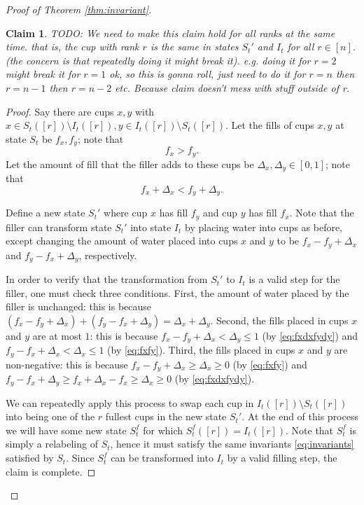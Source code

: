 \documentclass[twocolumn]{article}[10pt]
\newtheorem{clm}{Claim}
\begin{document}
\begin{proof}[Proof of Theorem \ref{thm:invariant}]
\begin{clm}
  {\color{red} TODO: We need to make this claim hold for all ranks at the same time. that is, the cup with rank $r$ is the same in states $S_t'$ and $I_t$ for all $r \in [n]$. (the concern is that repeatedly doing it might break it). e.g. doing it for $r=2$ might break it for $r=1$}
  {\color{red} ok, so this is gonna roll, just need to do it for $r=n$ then $r=n-1$ then $r=n-2$ etc. Because claim doesn't mess with stuff outside of r. }
  
\end{clm}
\begin{proof}
Say there are cups $x, y$ with $x\in S_t([r]) \setminus I_t([r]), y \in
 I_t([r])\setminus S_t([r])$. Let the fills of cups $x,y$ at state $S_t$
 be $f_x, f_y$; note that 
 \begin{equation}
     f_x > f_y.
     \label{eq:fxfy}
 \end{equation} Let the amount of fill that the filler
 adds to these cups be $\Delta_x, \Delta_y \in [0,1]$; note that 
 \begin{equation}
 f_x +\Delta_x <f_y + \Delta_y.
 \label{eq:fxdxfydy}
 \end{equation}
 
Define a new state $S_t'$ where cup $x$ has fill $f_y$ and cup $y$ has fill $f_x$. 
Note that the filler can transform state $S_t'$ into state $I_t$ by placing water into cups as before, except changing the amount of water placed into cups $x$ and $y$ to be  
$f_x-f_y+\Delta_x$ and $f_y-f_x + \Delta_y$, respectively.

In order to verify that the transformation from $S_t'$ to $I_t$ is a valid step for the filler, one must check three conditions. 
First, the amount of water placed by the filler is unchanged: this is because $(f_x-f_y + \Delta_x) + (f_y-f_x+\Delta_y) = \Delta_x + \Delta_y$.
Second, the fills placed in cups $x$ and $y$ are at most $1$: this is because $f_x-f_y+\Delta_x<\Delta_y
\le 1$ (by \eqref{eq:fxdxfydy}) and $f_y-f_x + \Delta_x < \Delta_x \le 1$ (by \eqref{eq:fxfy}).
Third, the fills placed in cups $x$ and $y$ are non-negative: this is because $f_x-f_y + \Delta_x \ge \Delta_x \ge 0$ (by \eqref{eq:fxfy}) and $f_y-f_x+\Delta_y \ge f_x+\Delta_x-f_x \ge \Delta_x \ge 0$ (by \eqref{eq:fxdxfydy}). 

We can repeatedly apply this process to swap each cup in $I_t([r])\setminus
S_t([r])$ into being one of the $r$ fullest cups in the new state $S_t'$.
At the end of this process we will have some new state $S_t^f$ for which $S_t^f([r]) = I_t([r])$. Note that
$S_t^f$ is simply a relabeling of $S_t$, hence it must satisfy the same invariants 
\eqref{eq:invariants} satisfied by $S_t$. Since $S_t^f$ can be transformed into $I_t$ by a valid filling step, the claim is complete.
\end{proof}


\end{proof}
\end{document}
